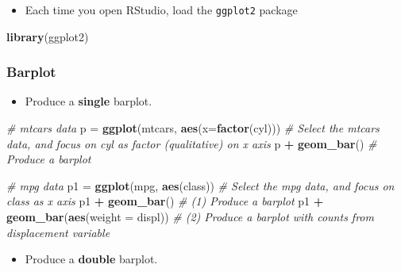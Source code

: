 \documentclass[]{article}
\newenvironment{Shaded}{\begin{snugshade}}{\end{snugshade}}
\newcommand{\CommentTok}[1]{\textcolor[rgb]{0.56,0.35,0.01}{\textit{#1}}}
\newcommand{\DataTypeTok}[1]{\textcolor[rgb]{0.13,0.29,0.53}{#1}}
\newcommand{\KeywordTok}[1]{\textcolor[rgb]{0.13,0.29,0.53}{\textbf{#1}}}
\newcommand{\NormalTok}[1]{#1}
\newcommand{\OperatorTok}[1]{\textcolor[rgb]{0.81,0.36,0.00}{\textbf{#1}}}
\newcommand{\StringTok}[1]{\textcolor[rgb]{0.31,0.60,0.02}{#1}}
\providecommand{\tightlist}{%
  \setlength{\itemsep}{0pt}\setlength{\parskip}{0pt}}
\begin{document}
\begin{itemize}
\tightlist
\item
  Each time you open RStudio, load the \texttt{ggplot2} package
\end{itemize}

\begin{Shaded}
\begin{Highlighting}[]
\KeywordTok{library}\NormalTok{(ggplot2)}
\end{Highlighting}
\end{Shaded}

\hypertarget{barplot-1}{%
\subsubsection{Barplot}\label{barplot-1}}

\begin{itemize}
\tightlist
\item
  Produce a \textbf{single} barplot.
\end{itemize}

\begin{Shaded}
\begin{Highlighting}[]
\CommentTok{# mtcars data}
\NormalTok{p =}\StringTok{ }\KeywordTok{ggplot}\NormalTok{(mtcars, }\KeywordTok{aes}\NormalTok{(}\DataTypeTok{x=}\KeywordTok{factor}\NormalTok{(cyl)))  }\CommentTok{# Select the mtcars data, and focus on cyl as factor (qualitative) on x axis}
\NormalTok{p }\OperatorTok{+}\StringTok{ }\KeywordTok{geom_bar}\NormalTok{()  }\CommentTok{# Produce a barplot}

\CommentTok{# mpg data}
\NormalTok{p1 =}\StringTok{ }\KeywordTok{ggplot}\NormalTok{(mpg, }\KeywordTok{aes}\NormalTok{(class)) }\CommentTok{# Select the mpg data, and focus on class as x axis}
\NormalTok{p1 }\OperatorTok{+}\StringTok{ }\KeywordTok{geom_bar}\NormalTok{() }\CommentTok{# (1) Produce a barplot}
\NormalTok{p1 }\OperatorTok{+}\StringTok{ }\KeywordTok{geom_bar}\NormalTok{(}\KeywordTok{aes}\NormalTok{(}\DataTypeTok{weight =}\NormalTok{ displ)) }\CommentTok{# (2) Produce a barplot with counts from displacement variable}
\end{Highlighting}
\end{Shaded}

\begin{itemize}
\tightlist
\item
  Produce a \textbf{double} barplot.
\end{itemize}
\end{document}
